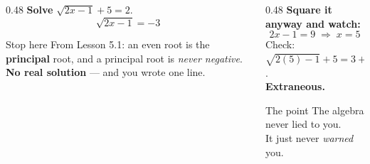 \documentclass[aspectratio=169, 11pt]{beamer}
\begin{document}
\begin{frame}[t, plain]
  \begin{columns}[T]
    \begin{column}{0.48\textwidth}
      \footnotesize
      \textbf{Solve} $\sqrt{2x-1}+5=2$.
      \vspace{4pt}
      \[ \sqrt{2x-1}=-3 \]
      \vspace{-6pt}
      \begin{block}{Stop here}
        From Lesson 5.1: an even root is the \textbf{principal} root, and a principal root is
        \emph{never negative}. \\[3pt]
        \textbf{No real solution} --- and you wrote one line.
      \end{block}
    \end{column}
    \begin{column}{0.48\textwidth}
      \footnotesize
      \textbf{Square it anyway and watch:}
      \vspace{3pt}
      \[ 2x-1=9 \;\Rightarrow\; x=5 \]
      Check: $\sqrt{2(5)-1}+5=3+5=8 \ne 2$. \\[4pt]
      \textbf{Extraneous.}
      \vspace{4pt}
      \begin{block}{The point}
        The algebra never lied to you. \\[3pt]
        It just never \emph{warned} you.
      \end{block}
    \end{column}
  \end{columns}
\end{frame}
\end{document}

